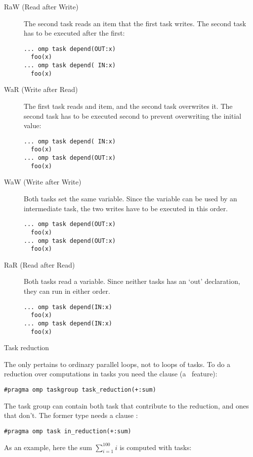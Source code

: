\begin{description}
\item[RaW (Read after Write)] The second task reads an item that the
  first task writes. The second task has to be executed after the
  first:
\begin{lstlisting}
... omp task depend(OUT:x)
  foo(x)
... omp task depend( IN:x)
  foo(x)
\end{lstlisting}
\item[WaR (Write after Read)] The first task reads and item, and the
  second task overwrites it. The second task has to be executed second
  to prevent overwriting the initial value:
\begin{lstlisting}
... omp task depend( IN:x)
  foo(x)
... omp task depend(OUT:x)
  foo(x)
\end{lstlisting}
\item[WaW (Write after Write)] Both tasks set the same variable. Since
  the variable can be used by an intermediate task, the two writes
  have to be executed in this order.
\begin{lstlisting}
... omp task depend(OUT:x)
  foo(x)
... omp task depend(OUT:x)
  foo(x)
\end{lstlisting}
\item[RaR (Read after Read)] Both tasks read a variable. Since neither
  tasks has an `out' declaration, they can run in either order.
\begin{lstlisting}
... omp task depend(IN:x)
  foo(x)
... omp task depend(IN:x)
  foo(x)
\end{lstlisting}
\end{description}

 {Task reduction}

The  only pertains to ordinary parallel loops,
not to  loops of tasks.
To do a reduction over computations in tasks you need the
 clause
(a~ feature):
\begin{lstlisting}
#pragma omp taskgroup task_reduction(+:sum)
\end{lstlisting}
The task group can contain both task that contribute to the reduction,
and ones that don't. The former type needs a clause :
\begin{lstlisting}
#pragma omp task in_reduction(+:sum)
\end{lstlisting}

As an example, here the sum $\sum_{i=1}^{100} i$ is computed with tasks:
%

